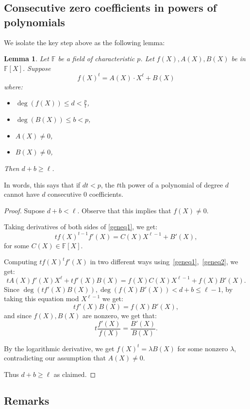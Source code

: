 \documentclass{article}
\newtheorem{lemma}[theorem]{Lemma}
\newcommand{\F}{\mathbb{F}}
\begin{document}
\subsection{Consecutive zero coefficients in powers of polynomials}

We isolate the key step above as the following lemma:

\begin{lemma}
\label{lemgen}
Let $\F$ be a field of characteristic $p$.
Let $f(X), A(X), B(X)$ be in $\F[X]$. 
 Suppose
 \begin{equation}
 \label{geneq1}
    f(X)^t = A(X) \cdot X^\ell + B(X)
 \end{equation}
 where:
 \begin{itemize}
  \item $\deg(f(X)) \leq d < \frac{p}{t}$,
  \item $\deg(B(X)) \leq b < p$,
  \item $A(X) \neq 0$,
  \item $B(X) \neq 0$,
\end{itemize}
Then $d + b \geq \ell$.
\end{lemma}
In words, this says that if $dt < p$, the $t$th power of a polynomial of degree $d$ cannot have $d$ consecutive $0$ coefficients.
\begin{proof}
Supose $d + b < \ell$. Observe that this implies that $f(X) \neq 0$.

 Taking derivatives of both sides of \eqref{geneq1}, we get:
 \begin{equation}
  \label{geneq2}
  t f(X)^{t-1} f'(X) = C(X) X^{\ell-1} + B'(X),
 \end{equation}
 for some $C(X) \in \F[X]$. 
 
 Computing $t f(X)^t f'(X)$ in two different ways using~\eqref{geneq1},~\eqref{geneq2}, we get:
 $$ t A(X) f'(X) X^{\ell} + t f'(X) B(X) = f(X) C(X) X^{\ell-1} + f(X) B'(X).$$
 Since $\deg(t f'(X) B(X)), \deg(f(X) B'(X)) < d+b \leq \ell - 1$,
 by taking this equation mod $X^{\ell-1}$ we get:
 $$ t f'(X) B(X) = f(X) B'(X),$$
 and since $f(X), B(X)$ are nonzero, we get that:
 $$ t \frac{f'(X)}{f(X)} = \frac{B'(X)}{B(X)}.$$
 
 By the logarithmic derivative, we get $f(X)^t = \lambda B(X)$ for some nonzero $\lambda$, contradicting our assumption that $A(X) \neq 0$.

 Thus $d+ b \geq \ell$ as claimed.
\end{proof}


\subsection{Remarks}
\label{sec:rem}
\end{document}
